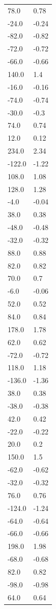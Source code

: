 \begin{longtable}{ll}
78.0 & 0.78 \\
-24.0 & -0.24 \\
-82.0 & -0.82 \\
-72.0 & -0.72 \\
-66.0 & -0.66 \\
140.0 & 1.4 \\
-16.0 & -0.16 \\
-74.0 & -0.74 \\
-30.0 & -0.3 \\
74.0 & 0.74 \\
12.0 & 0.12 \\
234.0 & 2.34 \\
-122.0 & -1.22 \\
108.0 & 1.08 \\
128.0 & 1.28 \\
-4.0 & -0.04 \\
38.0 & 0.38 \\
-48.0 & -0.48 \\
-32.0 & -0.32 \\
88.0 & 0.88 \\
82.0 & 0.82 \\
70.0 & 0.7 \\
-6.0 & -0.06 \\
52.0 & 0.52 \\
84.0 & 0.84 \\
178.0 & 1.78 \\
62.0 & 0.62 \\
-72.0 & -0.72 \\
118.0 & 1.18 \\
-136.0 & -1.36 \\
38.0 & 0.38 \\
-38.0 & -0.38 \\
42.0 & 0.42 \\
-22.0 & -0.22 \\
20.0 & 0.2 \\
150.0 & 1.5 \\
-62.0 & -0.62 \\
-32.0 & -0.32 \\
76.0 & 0.76 \\
-124.0 & -1.24 \\
-64.0 & -0.64 \\
-66.0 & -0.66 \\
198.0 & 1.98 \\
-68.0 & -0.68 \\
82.0 & 0.82 \\
-98.0 & -0.98 \\
64.0 & 0.64 \\

\end{longtable}
